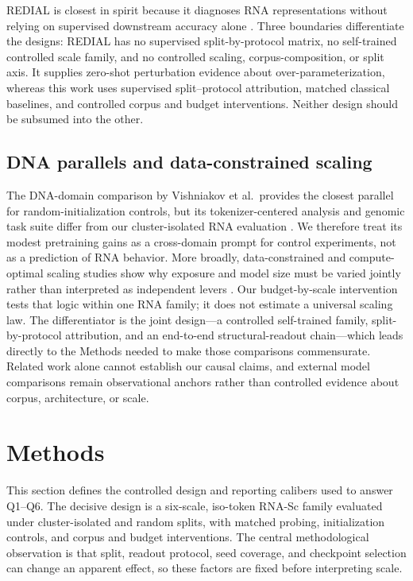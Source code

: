 REDIAL is closest in spirit because it diagnoses RNA representations without relying on supervised downstream accuracy alone \citep{redial}. Three boundaries differentiate the designs: REDIAL has no supervised split-by-protocol matrix, no self-trained controlled scale family, and no controlled scaling, corpus-composition, or split axis. It supplies zero-shot perturbation evidence about over-parameterization, whereas this work uses supervised split--protocol attribution, matched classical baselines, and controlled corpus and budget interventions. Neither design should be subsumed into the other.

\hypertarget{dna-parallels-and-data-constrained-scaling}{%
\subsection{DNA parallels and data-constrained scaling}\label{dna-parallels-and-data-constrained-scaling}}

The DNA-domain comparison by Vishniakov et al.~provides the closest parallel for random-initialization controls, but its tokenizer-centered analysis and genomic task suite differ from our cluster-isolated RNA evaluation \citep{vishniakov_tokenization}. We therefore treat its modest pretraining gains as a cross-domain prompt for control experiments, not as a prediction of RNA behavior. More broadly, data-constrained and compute-optimal scaling studies show why exposure and model size must be varied jointly rather than interpreted as independent levers \citep{muennighoff_data,hoffmann_chinchilla}. Our budget-by-scale intervention tests that logic within one RNA family; it does not estimate a universal scaling law. The differentiator is the joint design---a controlled self-trained family, split-by-protocol attribution, and an end-to-end structural-readout chain---which leads directly to the Methods needed to make those comparisons commensurate. Related work alone cannot establish our causal claims, and external model comparisons remain observational anchors rather than controlled evidence about corpus, architecture, or scale.

\hypertarget{methods}{%
\section{Methods}\label{methods}}

This section defines the controlled design and reporting calibers used to answer Q1--Q6. The decisive design is a six-scale, iso-token RNA-Sc family evaluated under cluster-isolated and random splits, with matched probing, initialization controls, and corpus and budget interventions. The central methodological observation is that split, readout protocol, seed coverage, and checkpoint selection can change an apparent effect, so these factors are fixed before interpreting scale.

